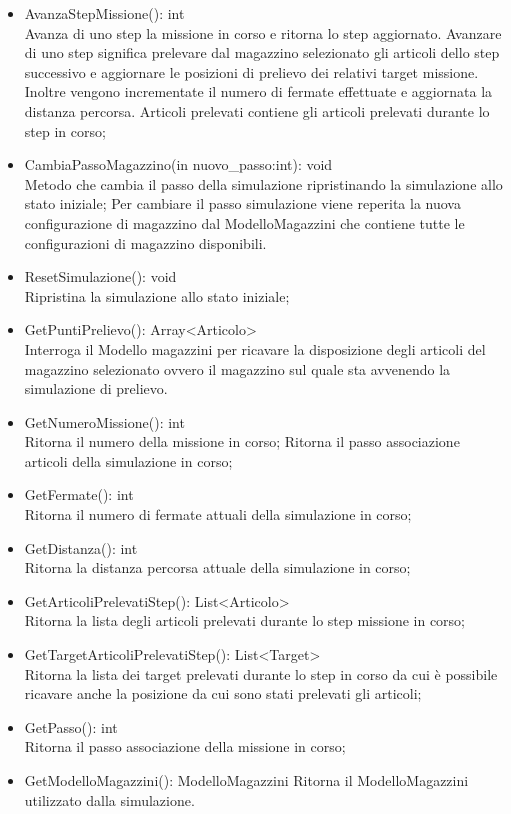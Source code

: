 \begin{itemize}
    \item AvanzaStepMissione(): int \\
    Avanza di uno step la missione in corso e ritorna lo step aggiornato. Avanzare di uno step significa prelevare dal magazzino selezionato gli articoli dello step successivo 
    e aggiornare le posizioni di prelievo dei relativi target missione. Inoltre vengono incrementate il numero di fermate effettuate e aggiornata la distanza percorsa.
    Articoli prelevati contiene gli articoli prelevati durante lo step in corso;
    \item CambiaPassoMagazzino(in nuovo\_passo:int): void \\
    Metodo che cambia il passo della simulazione ripristinando la simulazione allo stato iniziale;
    Per cambiare il passo simulazione viene reperita la nuova configurazione di magazzino dal ModelloMagazzini che contiene tutte le configurazioni di magazzino disponibili.
    \item ResetSimulazione(): void \\
    Ripristina la simulazione allo stato iniziale;
    \item GetPuntiPrelievo(): Array<Articolo> \\
    Interroga il Modello magazzini per ricavare la disposizione degli articoli del magazzino selezionato ovvero il magazzino sul quale sta avvenendo la simulazione di prelievo.
    \item GetNumeroMissione(): int \\
    Ritorna il numero della missione in corso;
    Ritorna il passo associazione articoli della simulazione in corso;
    \item GetFermate(): int \\
    Ritorna il numero di fermate attuali della simulazione in corso;
    \item GetDistanza(): int \\
    Ritorna la distanza percorsa attuale della simulazione in corso;
    \item GetArticoliPrelevatiStep(): List<Articolo> \\
    Ritorna la lista degli articoli prelevati durante lo step missione in corso;
    \item GetTargetArticoliPrelevatiStep(): List<Target> \\
    Ritorna la lista dei target prelevati durante lo step in corso da cui è possibile ricavare anche la posizione da cui sono stati prelevati gli articoli;
    \item GetPasso(): int \\
    Ritorna il passo associazione della missione in corso;\\
    \item GetModelloMagazzini(): ModelloMagazzini
    Ritorna il ModelloMagazzini utilizzato dalla simulazione.
\end{itemize} 
